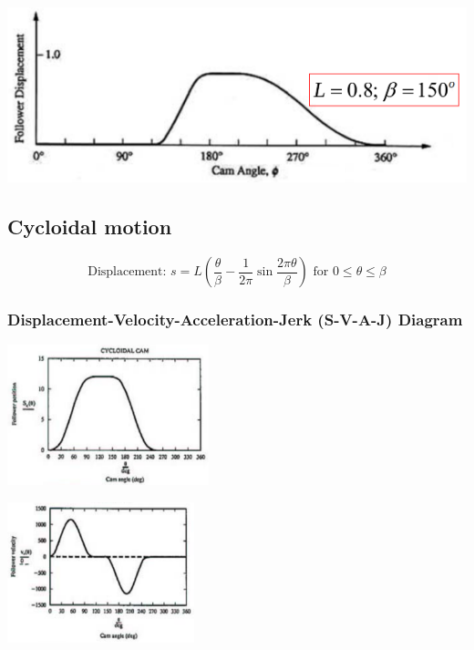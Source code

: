 \documentclass[11pt]{article}
\begin{document}
\begin{itemize}
\begin{itemize}
\begin{center}
\includegraphics[width=.9\linewidth]{./images/harmonic-motion-example-segment-3-and-4.png}
\end{center}
\end{itemize}
\end{itemize}
\subsection{Cycloidal motion}
\label{sec:org6c0eeb5}
\[\text{Displacement: } s = L \left(\frac{\theta}{\beta} - \frac{1}{2 \pi} \sin \frac{2 \pi \theta}{\beta} \right) \text{ for } 0 \le \theta \le \beta\]

 \newpage
\subsubsection{Displacement-Velocity-Acceleration-Jerk (S-V-A-J) Diagram}
\label{sec:orgddaa421}
\begin{center}
\includegraphics[height=11em]{./images/cycloidal-motion-displacement-graph.png}
\end{center}

\begin{center}
\includegraphics[height=11em]{./images/cycloidal-motion-velocity-graph.png}
\end{center}
\end{document}
